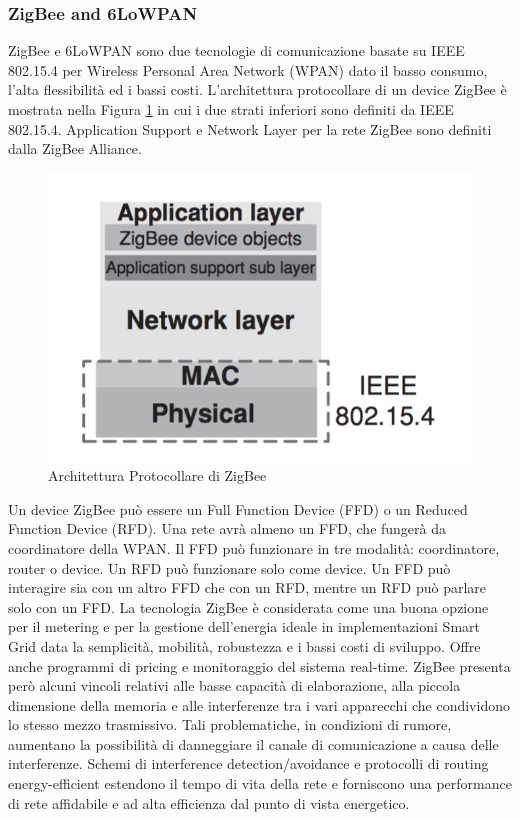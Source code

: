 \subsubsection{ZigBee and 6LoWPAN}
ZigBee e 6LoWPAN sono due tecnologie di comunicazione basate su IEEE 802.15.4 per Wireless Personal Area Network (WPAN) dato il basso consumo, l'alta flessibilità ed i bassi costi. L'architettura protocollare di un device ZigBee è mostrata nella Figura \ref{fig:zbprot} in cui i due strati inferiori sono definiti da IEEE 802.15.4. Application Support e Network Layer per la rete ZigBee sono definiti dalla ZigBee Alliance\cite{zb}.
\begin{figure}[h]
	\centering
	\includegraphics[scale=0.400]{imgs/zbprot.png}
	\caption{Architettura Protocollare di ZigBee} \label{fig:zbprot}
\end{figure}\newpage
Un device ZigBee può essere un Full Function Device (FFD) o un Reduced Function Device (RFD). Una rete avrà almeno un FFD, che fungerà da coordinatore della WPAN. Il FFD può funzionare in tre modalità: coordinatore, router o device. Un RFD può funzionare solo come device. Un FFD può interagire sia con un altro FFD che con un RFD, mentre un RFD può parlare solo con un FFD.
La tecnologia ZigBee è considerata come una buona opzione per il metering e per la gestione dell'energia ideale in implementazioni Smart Grid data la semplicità, mobilità, robustezza e i bassi costi di sviluppo. Offre anche programmi di pricing e monitoraggio del sistema real-time. ZigBee presenta però alcuni vincoli relativi alle basse capacità di elaborazione, alla piccola dimensione della memoria e alle interferenze tra i vari apparecchi che condividono lo stesso mezzo trasmissivo. Tali problematiche, in condizioni di rumore, aumentano la possibilità di danneggiare il canale di comunicazione a causa delle interferenze. Schemi di interference detection/avoidance e protocolli di routing energy-efficient estendono il tempo di vita della rete e forniscono una performance di rete affidabile e ad alta efficienza dal punto di vista energetico.
